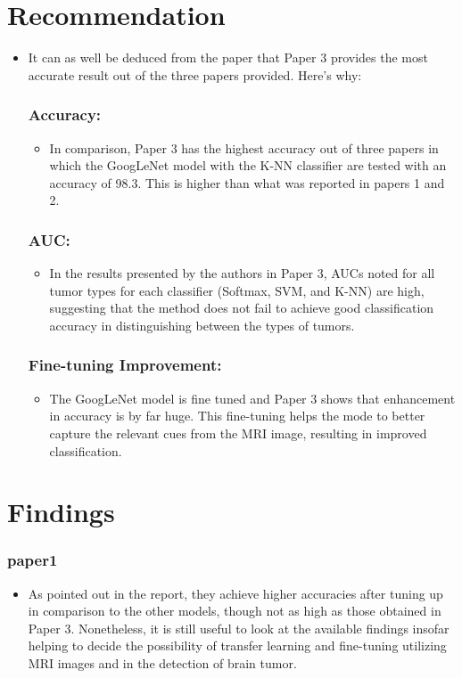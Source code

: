 \documentclass[a4paper,12pt]{extarticle}
\begin{document}
\newpage


\section{Recommendation}
\begin{itemize}
    \item It can as well be deduced from the paper that Paper 3 provides the most accurate result out of the three papers provided. Here's why:
    \subsubsection{Accuracy:}
     \begin{itemize}
         \item  In comparison, Paper 3 has the highest accuracy out of three papers in which the GoogLeNet model with the K-NN classifier are tested with an accuracy of 98.3. This is higher than what was reported in papers 1 and 2.
     \end{itemize}
      \subsubsection{AUC:}
      \begin{itemize}
         \item In the results presented by the authors in Paper 3, AUCs noted for all tumor types for each classifier (Softmax, SVM, and K-NN) are high, suggesting that the method does not fail to achieve good classification\cite{zhang2020dual} accuracy in distinguishing between the types of tumors.
     \end{itemize}
     \subsubsection{Fine-tuning Improvement:}
   \begin{itemize}
         \item The GoogLeNet model is fine tuned and Paper 3 shows that enhancement in accuracy is by far huge. This fine-tuning helps the mode to better capture the relevant cues from the MRI image, resulting in improved classification.
     \end{itemize}
\end{itemize}

\section{Findings}
\subsubsection{paper1}
\begin{itemize}
    \item  As pointed out in the report, they achieve higher accuracies after tuning up in comparison to the other models, though not as high as those obtained in Paper 3. Nonetheless, it is still useful to look at the available findings insofar helping to decide the possibility of transfer learning and fine-tuning utilizing MRI images and in the detection of brain tumor.
\end{itemize}
\end{document}
